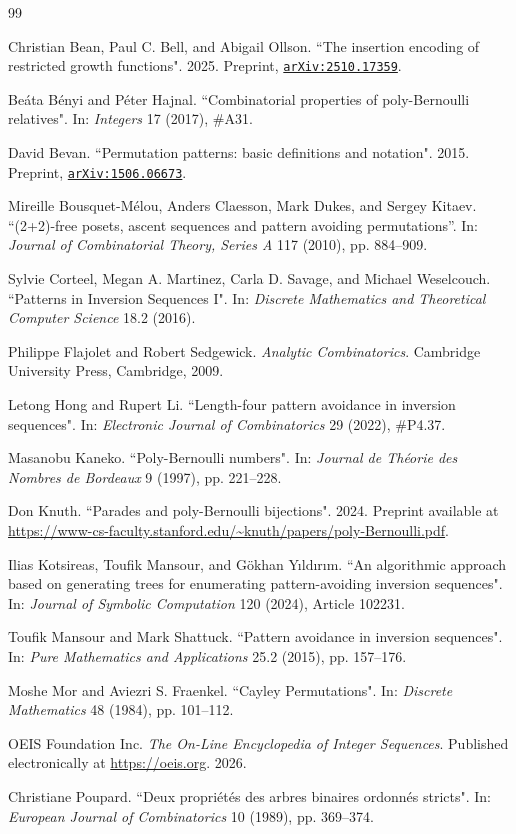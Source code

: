 \documentclass[a4paper,11pt]{article}
\theoremstyle{definition}
\theoremstyle{remark}
\begin{document}
\begin{thebibliography}{99}

Christian Bean, Paul C. Bell, and Abigail Ollson. ``The insertion encoding of restricted growth functions". 2025. Preprint, \href{https://arxiv.org/abs/2510.17359}{\texttt{arXiv:2510.17359}}.


Be\'ata B\'enyi and P\'eter Hajnal. ``Combinatorial properties of poly-Bernoulli relatives". In: \emph{Integers} 17 (2017), \#A31.

David Bevan. ``Permutation patterns: basic definitions and notation". 2015. Preprint, \href{https://arxiv.org/abs/1506.06673}{\texttt{arXiv:1506.06673}}.

Mireille Bousquet-M\'elou, Anders Claesson, Mark Dukes, and Sergey Kitaev. ``(2+2)-free posets, ascent sequences and pattern avoiding permutations”. In: \emph{Journal of Combinatorial Theory, Series A} 117 (2010), pp. 884–909.


Sylvie Corteel, Megan A. Martinez, Carla D. Savage, and Michael Weselcouch. ``Patterns in Inversion Sequences {I}". In: \emph{Discrete Mathematics and Theoretical Computer Science} 18.2 (2016).

Philippe Flajolet and Robert Sedgewick. \emph{Analytic Combinatorics}. Cambridge University Press, Cambridge, 2009.

Letong Hong and Rupert Li. ``Length-four pattern avoidance in inversion sequences". In: \emph{Electronic Journal of Combinatorics} 29 (2022), \#P4.37.

Masanobu Kaneko. ``Poly-Bernoulli numbers". In: \emph{Journal de Théorie des Nombres de Bordeaux} 9 (1997), pp. 221–228.

Don Knuth. ``Parades and poly-Bernoulli bijections". 2024. Preprint available at \url{https://www-cs-faculty.stanford.edu/~knuth/papers/poly-Bernoulli.pdf}.

Ilias Kotsireas, Toufik Mansour, and G\"okhan Y\i ld\i r\i m. ``An algorithmic approach based on generating trees for enumerating pattern-avoiding inversion sequences". In: \emph{Journal of Symbolic Computation} 120 (2024), Article 102231.

Toufik Mansour and Mark Shattuck. ``Pattern avoidance in inversion sequences". In: \emph{Pure Mathematics and Applications} 25.2 (2015), pp. 157–176.

Moshe Mor and Aviezri S. Fraenkel. ``Cayley Permutations". In: \emph{Discrete Mathematics} 48 (1984), pp. 101–112.

OEIS Foundation Inc. \emph{The On-Line Encyclopedia of Integer Sequences}. Published electronically at \url{https://oeis.org}. 2026.

Christiane Poupard. ``Deux propriétés des arbres binaires ordonnés stricts". In: \emph{European Journal of Combinatorics} 10 (1989), pp. 369–374.

\end{thebibliography}
\end{document}
